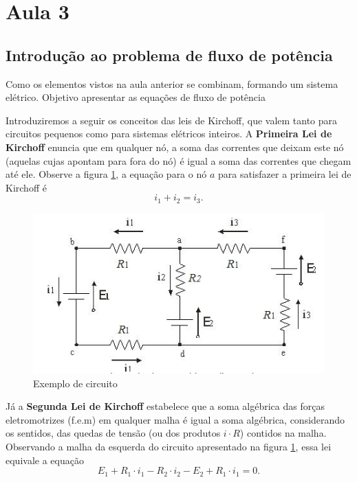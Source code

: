 \section{Aula 3}


\subsection{Introdução ao problema de fluxo de potência}

Como os elementos vistos na aula anterior se combinam, formando um
sistema elétrico. Objetivo apresentar as equações de fluxo de potência 

Introduziremos a seguir os conceitos das leis de Kirchoff, que valem
tanto para circuitos pequenos como para sistemas elétricos inteiros.
A\textbf{ Primeira Lei de Kirchoff} enuncia que em qualquer nó, a
soma das correntes que deixam este nó (aquelas cujas apontam para
fora do nó) é igual a soma das correntes que chegam até ele. Observe
a figura \ref{fig:Exemplo-de-circuito}, a equação para o nó $a$
para satisfazer a primeira lei de Kirchoff é 
\[
i_{1}+i_{2}=i_{3}.
\]


\begin{figure}
\begin{centering}
\includegraphics{anexos/aula3_circuito}
\par\end{centering}

\protect\caption{\label{fig:Exemplo-de-circuito}Exemplo de circuito}
\end{figure}


Já a \textbf{Segunda Lei de Kirchoff} estabelece que a soma algébrica
das forças eletromotrizes (f.e.m) em qualquer malha é igual a soma
algébrica, considerando os sentidos, das quedas de tensão (ou dos
produtos $i\cdot R$) contidos na malha. Observando a malha da esquerda
do circuito apresentado na figura \ref{fig:Exemplo-de-circuito},
essa lei equivale a equação
\[
E_{1}+R_{1}\cdot i_{1}-R_{2}\cdot i_{2}-E_{2}+R_{1}\cdot i_{1}=0.
\]


